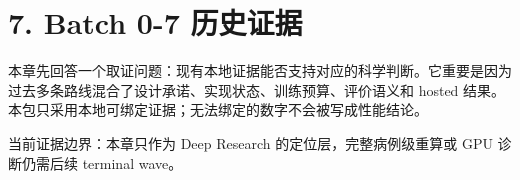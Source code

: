 \section{7. Batch 0-7 历史证据}

本章先回答一个取证问题：现有本地证据能否支持对应的科学判断。它重要是因为过去多条路线混合了设计承诺、实现状态、训练预算、评价语义和 hosted 结果。本包只采用本地可绑定证据；无法绑定的数字不会被写成性能结论。



当前证据边界：本章只作为 Deep Research 的定位层，完整病例级重算或 GPU 诊断仍需后续 terminal wave。



\clearpage